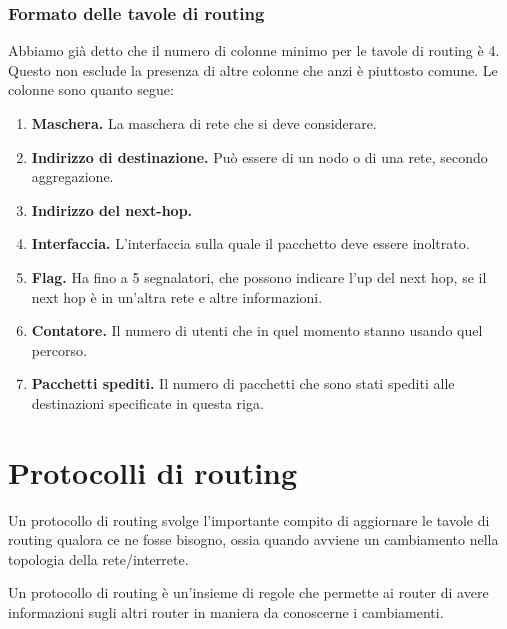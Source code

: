         \subsubsection{Formato delle tavole di routing}
            Abbiamo già detto che il numero di colonne minimo per le tavole di routing è 4. Questo non esclude la presenza di altre colonne che anzi è piuttosto comune. Le colonne sono quanto segue:
            \begin{enumerate}
                \item \textbf{Maschera.} La maschera di rete che si deve considerare.
                
                \item \textbf{Indirizzo di destinazione.} Può essere di un nodo o di una rete, secondo aggregazione.
                
                \item \textbf{Indirizzo del next-hop.}
                
                \item \textbf{Interfaccia.} L'interfaccia sulla quale il pacchetto deve essere inoltrato.
                
                \item \textbf{Flag.} Ha fino a 5 segnalatori, che possono indicare l'up del next hop, se il next hop è in un'altra rete e altre informazioni.
                
                \item \textbf{Contatore.} Il numero di utenti che in quel momento stanno usando quel percorso.
                
                \item \textbf{Pacchetti spediti.} Il numero di pacchetti che sono stati spediti alle destinazioni specificate in questa riga.
            \end{enumerate}
        
\section{Protocolli di routing}
    Un protocollo di routing svolge l'importante compito di aggiornare le tavole di routing qualora ce ne fosse bisogno, ossia quando avviene un cambiamento nella topologia della rete/interrete.
    
    Un protocollo di routing è un'insieme di regole che permette ai router di avere informazioni sugli altri router in maniera da conoscerne i cambiamenti.
    
